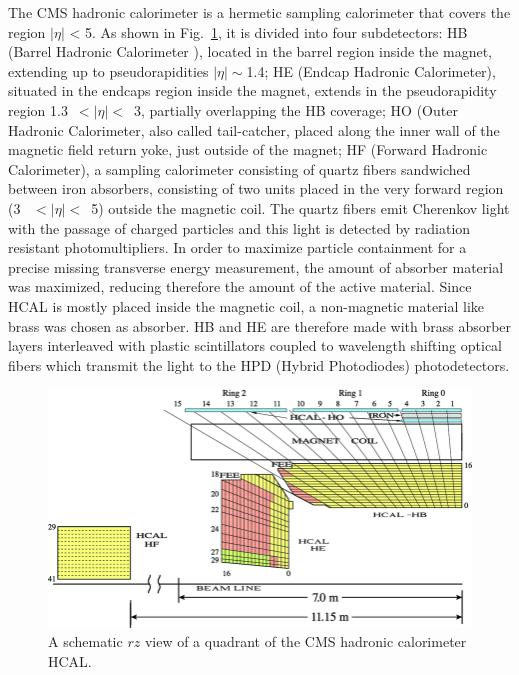 The CMS hadronic calorimeter is
a hermetic sampling calorimeter that covers the region $|\eta|$ < 5. As shown in Fig.~\ref{hcal},
it is divided into four subdetectors: HB (Barrel Hadronic Calorimeter ), located in the
barrel region inside the magnet, extending up to pseudorapidities  $|\eta|\sim$1.4; HE (Endcap
Hadronic Calorimeter), situated in the endcaps region inside the magnet, extends in the
pseudorapidity region 1.3~$<|\eta|<$~3, partially overlapping the HB coverage; HO (Outer
Hadronic Calorimeter, also called tail-catcher, placed along the inner wall of the magnetic 
field return yoke, just outside of the magnet; HF (Forward Hadronic Calorimeter),
a sampling calorimeter consisting of quartz fibers sandwiched between iron absorbers,
consisting of two units placed in the very forward region (3 ~$<|\eta|<$~5) outside the magnetic coil. 
The quartz fibers emit Cherenkov light with the passage of charged particles
and this light is detected by radiation resistant photomultipliers.
In order to maximize particle containment for a precise missing transverse energy
measurement, the amount of absorber material was maximized, reducing therefore the
amount of the active material. Since HCAL is mostly placed inside the magnetic coil,
a non-magnetic material like brass was chosen as absorber. HB and HE are therefore
made with brass absorber layers interleaved with plastic scintillators
coupled to wavelength shifting optical fibers which transmit the light to the HPD (Hybrid
Photodiodes) photodetectors.
\begin{figure}
\centering
\includegraphics[scale= 0.4]{../Cap2/hcal}
\caption{A schematic $rz$ view of a quadrant of the CMS hadronic calorimeter HCAL.}
\label{hcal}
\end{figure}


